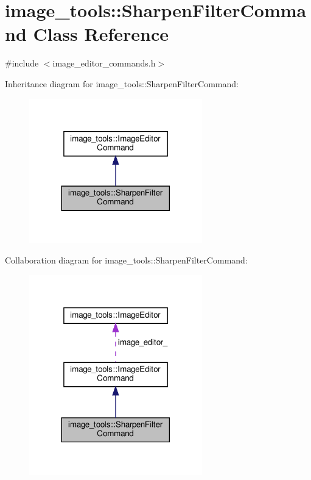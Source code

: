 \hypertarget{classimage__tools_1_1SharpenFilterCommand}{}\section{image\+\_\+tools\+:\+:Sharpen\+Filter\+Command Class Reference}
\label{classimage__tools_1_1SharpenFilterCommand}


{\ttfamily \#include $<$image\+\_\+editor\+\_\+commands.\+h$>$}



Inheritance diagram for image\+\_\+tools\+:\+:Sharpen\+Filter\+Command\+:
\nopagebreak
\begin{figure}[H]
\begin{center}
\leavevmode
\includegraphics[width=213pt]{classimage__tools_1_1SharpenFilterCommand__inherit__graph}
\end{center}
\end{figure}


Collaboration diagram for image\+\_\+tools\+:\+:Sharpen\+Filter\+Command\+:
\nopagebreak
\begin{figure}[H]
\begin{center}
\leavevmode
\includegraphics[width=213pt]{classimage__tools_1_1SharpenFilterCommand__coll__graph}
\end{center}
\end{figure}
